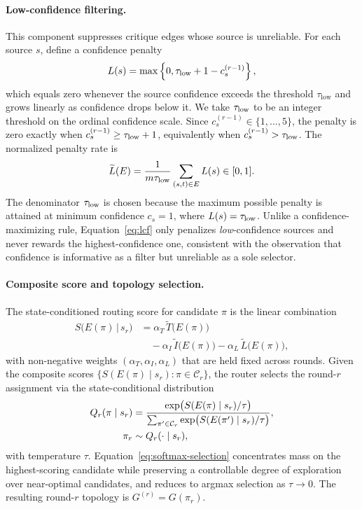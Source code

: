 \paragraph{Low-confidence filtering.}
This component suppresses critique edges whose source is unreliable. For each source $s$, define a confidence penalty
\begin{equation}
    L(s)
=
\max\left\{0,\tau_{\rm low}+1-c_s^{(r-1)}\right\},
    \label{eq:lcf}
\end{equation}
which equals zero whenever the source confidence exceeds the threshold $\tau_{\mathrm{low}}$ and grows linearly as confidence drops below it. We take $\tau_{\rm low}$ to be an integer threshold on the ordinal confidence
scale. Since $c_s^{(r-1)}\in\{1,\ldots,5\}$, the penalty is zero exactly when
$c_s^{(r-1)}\ge \tau_{\rm low}+1$, equivalently when
$c_s^{(r-1)}>\tau_{\rm low}$.
The normalized penalty rate is
\begin{equation}
        \widetilde L(E)
=
\frac{1}{m\tau_{\rm low}}
\sum_{(s,t)\in E} L(s)
\in[0,1].
    \label{eq:lcf-rate}
\end{equation}
The denominator $\tau_{\rm low}$ is chosen because the maximum possible
penalty is attained at minimum confidence $c_s=1$, where
$L(s)=\tau_{\rm low}$.
Unlike a confidence-maximizing rule, Equation~\eqref{eq:lcf} only penalizes \emph{low}-confidence sources and never rewards the highest-confidence one, consistent with the observation that confidence is informative as a filter but unreliable as a sole selector.
 
\paragraph{Composite score and topology selection.}
The state-conditioned routing score for candidate $\pi$ is the linear combination
\begin{align}
S\big(E(\pi)\,\big|\,s_r\big)
&=
\alpha_T\,\widetilde{T}\big(E(\pi)\big) \\
&\quad
-\alpha_I\,\widetilde{I}\big(E(\pi)\big)
-\alpha_L\,\widetilde{L}\big(E(\pi)\big),\nonumber
\end{align}
with non-negative weights $(\alpha_T,\alpha_I,\alpha_L)$ that are held fixed across rounds. Given the composite scores $\{S(E(\pi)\mid s_r):\pi\in\mathcal{C}_r\}$, the router selects the round-$r$ assignment via the state-conditional distribution
\begin{align}
    Q_r(\pi\mid s_r)
    &=
    \frac{\exp\!\big(S(E(\pi)\mid s_r)/\tau\big)}
         {\sum_{\pi'\in\mathcal{C}_r}\exp\!\big(S(E(\pi')\mid s_r)/\tau\big)},\notag\\
    \pi_r &\sim Q_r(\cdot\mid s_r),
\label{eq:softmax-selection}
\end{align}
with temperature $\tau$. Equation~\eqref{eq:softmax-selection} concentrates mass on the highest-scoring candidate while preserving a controllable degree of exploration over near-optimal candidates, and reduces to argmax selection as $\tau\!\to\!0$. The resulting round-$r$ topology is $G^{(r)}=G(\pi_r)$.

